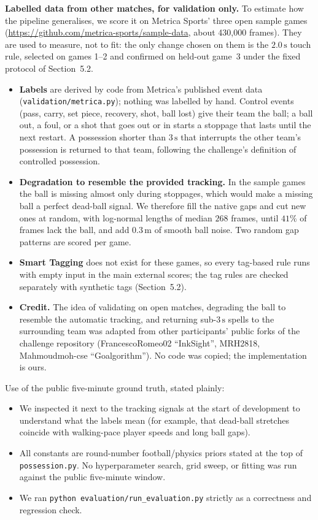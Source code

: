 \documentclass[11pt,a4paper]{article}
\newcommand{\code}[1]{\texttt{#1}}
\begin{document}
\textbf{Labelled data from other matches, for validation only.} To estimate how the pipeline
generalises, we score it on Metrica Sports' three open sample games
(\url{https://github.com/metrica-sports/sample-data}, about 430{,}000 frames). They are used to
measure, not to fit: the only change chosen on them is the $2.0\,\text{s}$ touch rule, selected on
games 1--2 and confirmed on held-out game~3 under the fixed protocol of Section~5.2.
\begin{itemize}
  \item \textbf{Labels} are derived by code from Metrica's published event data
        (\code{validation/metrica.py}); nothing was labelled by hand. Control events (pass, carry,
        set piece, recovery, shot, ball lost) give their team the ball; a ball out, a foul, or a
        shot that goes out or in starts a stoppage that lasts until the next restart. A possession
        shorter than $3\,\text{s}$ that interrupts the other team's possession is returned to
        that team, following the challenge's definition of controlled possession.
  \item \textbf{Degradation to resemble the provided tracking.} In the sample games the ball is
        missing almost only during stoppages, which would make a missing ball a perfect dead-ball
        signal. We therefore fill the native gaps and cut new ones at random, with log-normal
        lengths of median $268$ frames, until $41\%$ of frames lack the ball, and add $0.3\,\text{m}$
        of smooth ball noise. Two random gap patterns are scored per game.
  \item \textbf{Smart Tagging} does not exist for these games, so every tag-based rule runs with
        empty input in the main external scores; the tag rules are checked separately with
        synthetic tags (Section~5.2).
  \item \textbf{Credit.} The idea of validating on open matches, degrading the ball to resemble
        the automatic tracking, and returning sub-$3\,\text{s}$ spells to the surrounding team
        was adapted from other participants' public forks of the challenge repository
        (FrancescoRomeo02 ``InkSight'', MRH2818, Mahmoudmoh-cse ``Goalgorithm''). No code was
        copied; the implementation is ours.
\end{itemize}

Use of the public five-minute ground truth, stated plainly:

\begin{itemize}
  \item We inspected it next to the tracking signals at the start of development to understand
        what the labels mean (for example, that dead-ball stretches coincide with walking-pace
        player speeds and long ball gaps).
  \item All constants are round-number football/physics priors stated at the top of
        \code{possession.py}. No hyperparameter search, grid sweep, or fitting was run against the
        public five-minute window.
  \item We ran \code{python evaluation/run\_evaluation.py} strictly as a correctness and
        regression check.
\end{itemize}
\end{document}
